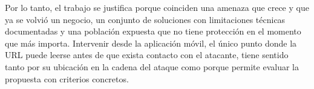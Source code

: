Por lo tanto, el trabajo se justifica porque coinciden una amenaza que crece y que ya se volvió un negocio, un conjunto de soluciones con limitaciones técnicas documentadas y una población expuesta que no tiene protección en el momento que más importa. Intervenir desde la aplicación móvil, el único punto donde la URL puede leerse antes de que exista contacto con el atacante, tiene sentido tanto por su ubicación en la cadena del ataque como porque permite evaluar la propuesta con criterios concretos.
